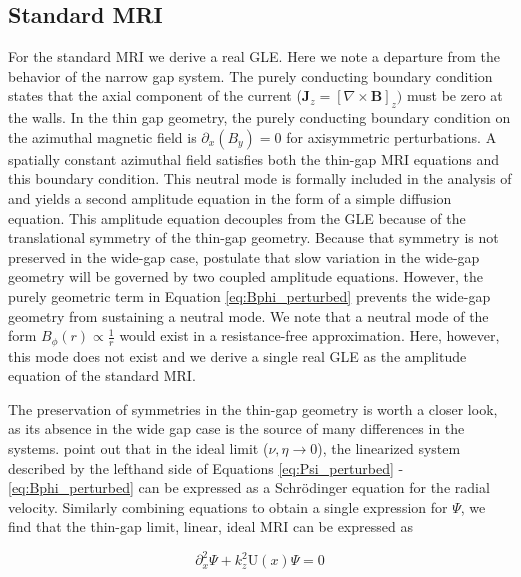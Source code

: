 \documentclass{emulateapj}
\newcommand{\beq}{\begin{equation}}
\newcommand{\eeq}{\end{equation}}
\begin{document}
\subsection{Standard MRI}
\label{sec:SMRI}
For the standard MRI we derive a real GLE. Here we note a departure from the behavior of the narrow gap system. The purely conducting boundary condition states that the axial component of the current ($\mathbf{J}_z = [\nabla \times \mathbf{B}]_z)$ must be zero at the walls. In the thin gap geometry, the purely conducting boundary condition on the azimuthal magnetic field is $\partial_x(B_y) = 0$ for axisymmetric perturbations. A spatially constant azimuthal field satisfies both the thin-gap MRI equations and this boundary condition. This neutral mode is formally included in the analysis of \citet{Umurhan:2007hs} and yields a second amplitude equation in the form of a simple diffusion equation. This amplitude equation decouples from the GLE because of the translational symmetry of the thin-gap geometry. Because that symmetry is not preserved in the wide-gap case, \citet{Umurhan:2007hs} postulate that slow variation in the wide-gap geometry will be governed by two coupled amplitude equations. However, the purely geometric term in Equation \ref{eq:Bphi_perturbed} prevents the wide-gap geometry from sustaining a neutral mode. We note that a neutral mode of the form $B_\phi(r) \propto \frac{1}{r}$ would exist in a resistance-free approximation. Here, however, this mode does not exist and we derive a single real GLE as the amplitude equation of the standard MRI.

The preservation of symmetries in the thin-gap geometry is worth a closer look, as its absence in the wide gap case is the source of many differences in the systems. \citet{Latter:2015} point out that in the ideal limit ($\nu, \eta \rightarrow 0$), the linearized system described by the lefthand side of Equations \ref{eq:Psi_perturbed} - \ref{eq:Bphi_perturbed} can be expressed as a Schr{\"o}dinger equation for the radial velocity. Similarly combining equations to obtain a single expression for $\Psi$, we find that the thin-gap limit, linear, ideal MRI can be expressed as

\beq
\partial_x^2 \Psi + k_z^2 \mathrm{U}(x) \Psi = 0
\eeq 
\end{document}
